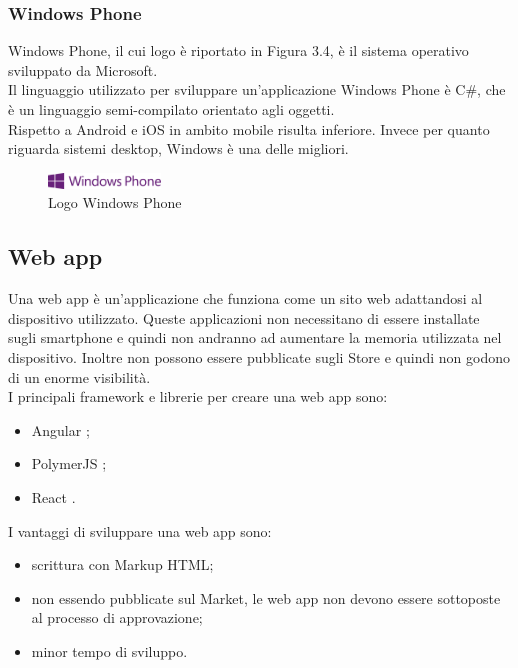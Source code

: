  \subsubsection{Windows Phone}
Windows Phone, il cui logo è riportato in Figura 3.4, è il sistema operativo sviluppato da Microsoft.\\
Il linguaggio utilizzato per sviluppare un'applicazione Windows Phone è C\#, che è un linguaggio semi-compilato orientato agli oggetti.\\
Rispetto a Android e iOS in ambito mobile risulta inferiore. Invece per quanto riguarda sistemi desktop, Windows è una delle migliori.\\
 \begin{figure}[htbp]	
	\centering
	\includegraphics[width=3cm]{immagini/logowindowsphone.png}
	\caption{Logo Windows Phone}
	\label{fig:Logo Windows Phone}
\end{figure}
 
\subsection{Web app}
Una web app \cite{differenza,apptonative} è un'applicazione che funziona come un sito web adattandosi al dispositivo utilizzato.
Queste applicazioni non necessitano di essere installate sugli smartphone e quindi non andranno ad aumentare la memoria utilizzata nel dispositivo.
 Inoltre non possono essere pubblicate sugli Store e quindi non godono di un enorme visibilità.\\
I principali framework e librerie per creare una web app sono:
\begin{itemize}
	\item Angular \cite{angular}; 
	\item PolymerJS \cite{polymer}; 
	\item React \cite{react}.
\end{itemize}
I vantaggi di sviluppare una web app sono:
\begin{itemize}
	\item scrittura con Markup HTML;
	\item non essendo pubblicate sul Market, le web app non devono essere sottoposte al processo di approvazione; 
	\item minor tempo di sviluppo.
\end{itemize}

\newpage

